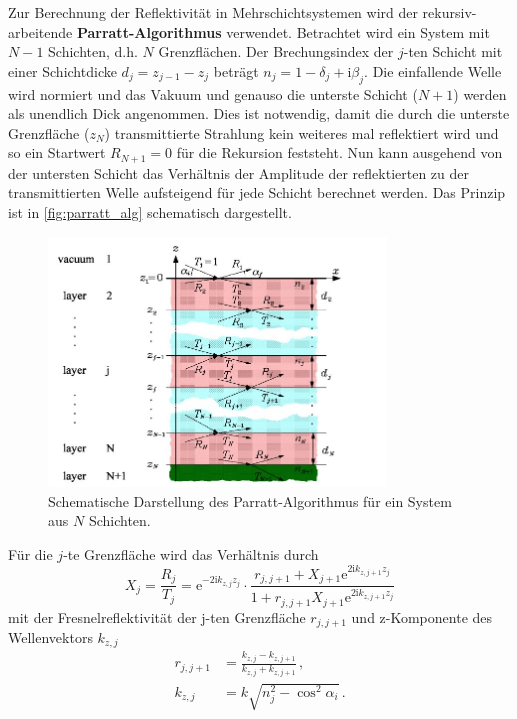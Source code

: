Zur Berechnung der Reflektivität in Mehrschichtsystemen wird der rekursiv-arbeitende \textbf{Parratt-Algorithmus} verwendet.
Betrachtet wird ein System mit $N-1$ Schichten, d.h. $N$ Grenzflächen.
Der Brechungsindex der $j$-ten Schicht mit einer Schichtdicke $d_j = z_{j-1} - z_j$ beträgt $n_j = 1 - \delta_j + \mathrm{i} \beta_j$.
Die einfallende Welle wird normiert und das Vakuum und genauso die unterste Schicht ($N+1$) werden als unendlich Dick angenommen.
Dies ist notwendig, damit die durch die unterste Grenzfläche ($z_N$) transmittierte Strahlung kein weiteres mal reflektiert wird und so ein Startwert $R_{N+1} = 0$ für die Rekursion feststeht.
Nun kann ausgehend von der untersten Schicht das Verhältnis der Amplitude der reflektierten zu der transmittierten Welle aufsteigend für jede Schicht berechnet werden.
Das Prinzip ist in \autoref{fig:parratt_alg} schematisch dargestellt.
\begin{figure}
    \centering
    \includegraphics[width=0.8\textwidth]{content/data/parratt_algorithmus.jpg}
    \caption{Schematische Darstellung des Parratt-Algorithmus für ein System aus $N$ Schichten.\cite[10]{alte_anleitung}}
    \label{fig:parratt_alg}
\end{figure}
Für die $j$-te Grenzfläche wird das Verhältnis durch
\begin{equation*}
    X_j = \frac{R_j}{T_j} = \mathrm{e}^{-2\mathrm{i} k_{z,j} z_j} \cdot \frac{r_{j,j+1} + X_{j+1} \mathrm{e}^{2\mathrm{i} k_{z,j+1} z_j}}{1 + r_{j,j+1} X_{j+1} \mathrm{e}^{2\mathrm{i} k_{z,j+1} z_j}}
    \label{eqn:parratt_alg}
\end{equation*}
mit der Fresnelreflektivität der j-ten Grenzfläche $r_{j,j+1}$ und z-Komponente des Wellenvektors $k_{z,j}$
\begin{align*}
    r_{j,j+1} &= \frac{k_{z,j} - k_{z,j+1}}{k_{z,j} + k_{z,j+1}} \, ,\\
    k_{z,j} &= k \sqrt{ n_j^2 - \cos^2 \alpha_i} \, .
\end{align*}
\FloatBarrier

